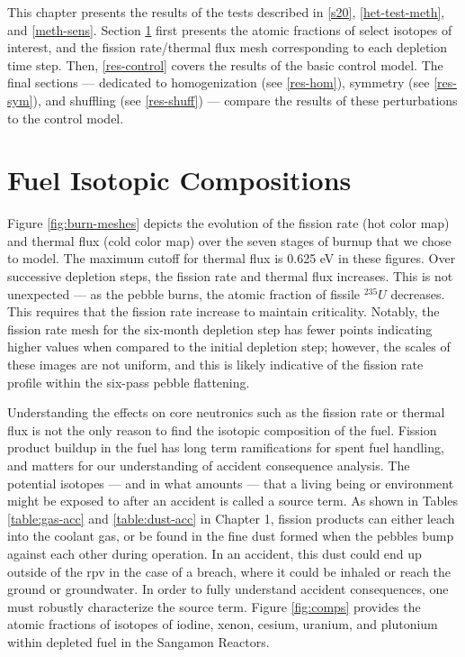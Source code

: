 \label{res}
This chapter presents the results of the tests described in \autoref{s20},  \ref{het-test-meth}, and  \ref{meth-sens}.  Section \ref{res-comps} first presents the atomic fractions of select isotopes of interest, and the fission rate/thermal flux mesh corresponding to each depletion time step.  Then, \autoref{res-control} covers the results of the basic control model. The final sections --- dedicated to homogenization (see \autoref{res-hom}), symmetry (see \autoref{res-sym}), and shuffling (see \autoref{res-shuff}) --- compare the results of these perturbations to the control model.

\section{Fuel Isotopic Compositions}
\label{res-comps}

Figure \ref{fig:burn-meshes} depicts the evolution of the fission rate (hot color map) and thermal flux (cold color map) over the seven stages of burnup that we chose to model.  The maximum cutoff for thermal flux is 0.625 eV in these figures.  Over successive depletion steps, the fission rate and thermal flux increases.  This is not unexpected --- as the pebble burns, the atomic fraction of fissile $^{235}U$ decreases.  This requires that the fission rate increase to maintain criticality.  Notably, the fission rate mesh for the six-month depletion step has fewer points indicating higher values when compared to the initial depletion step; however, the scales of these images are not uniform, and this is likely indicative of the fission rate profile within the six-pass pebble flattening.



Understanding the effects on core neutronics such as the fission rate or thermal flux is not the only reason to find the isotopic composition of the fuel.  Fission product buildup in the fuel has long term ramifications for spent fuel handling, and matters for our understanding of accident consequence analysis.  The potential isotopes --- and in what amounts --- that a living being or environment might be exposed to after an accident is called a source term.  As shown in Tables \ref{table:gas-acc} and \ref{table:dust-acc} in Chapter 1, fission products can either leach into the coolant gas, or be found in the fine dust formed when the pebbles bump against each other during operation.  In an accident, this dust could end up outside of the \acrshort{rpv} in the case of a breach, where it could be inhaled or reach the ground or groundwater.  In order to fully understand accident consequences, one must robustly characterize the source term.  Figure \ref{fig:comps} provides the atomic fractions of isotopes of iodine, xenon, cesium, uranium, and plutonium within depleted fuel in the Sangamon Reactors.

